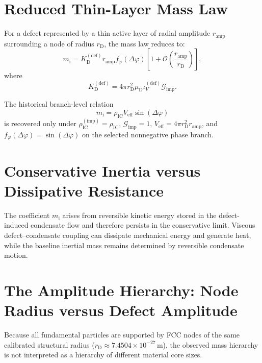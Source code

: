 \section{Reduced Thin-Layer Mass Law}

For a defect represented by a thin active layer of radial amplitude $r_{\mathrm{amp}}$ surrounding a node of radius $r_{\mathrm{D}}$, the mass law reduces to:
\begin{equation}
    m_{\mathrm{i}} = K_{\mathrm{D}}^{(\mathrm{def})} r_{\mathrm{amp}} f_{\varphi}(\Delta\varphi) \left[ 1+ \mathcal{O} \left( \frac{r_{\mathrm{amp}}}{r_{\mathrm{D}}} \right) \right],
\end{equation}
where
\begin{equation}
    K_{\mathrm{D}}^{(\mathrm{def})} = 4\pi r_{\mathrm{D}}^2 \mu_{\mathrm{D}} \iota_V^{(\mathrm{def})} \mathcal{G}_{\mathrm{imp}}.
\end{equation}

The historical branch-level relation
\begin{equation}
    m_{\mathrm{i}} = \rho_{\mathrm{IC}} V_{\mathrm{eff}} \sin(\Delta\varphi)
\end{equation}
is recovered only under $\rho_{\mathrm{IC}}^{(\mathrm{imp})} = \rho_{\mathrm{IC}}$, $\mathcal{G}_{\mathrm{imp}} = 1$, $V_{\mathrm{eff}} = 4\pi r_{\mathrm{D}}^2 r_{\mathrm{amp}}$, and $f_{\varphi}(\Delta\varphi) = \sin(\Delta\varphi)$ on the selected nonnegative phase branch.

\section{Conservative Inertia versus Dissipative Resistance}

The coefficient $m_{\mathrm{i}}$ arises from reversible kinetic energy stored in the defect-induced condensate flow and therefore persists in the conservative limit. Viscous defect–condensate coupling can dissipate mechanical energy and generate heat, while the baseline inertial mass remains determined by reversible condensate motion.

\section{The Amplitude Hierarchy: Node Radius versus Defect Amplitude}

Because all fundamental particles are supported by FCC nodes of the same calibrated structural radius ($r_{\mathrm{D}} \approx 7.4504\times10^{-27}\,\mathrm{m}$), the observed mass hierarchy is not interpreted as a hierarchy of different material core sizes.

